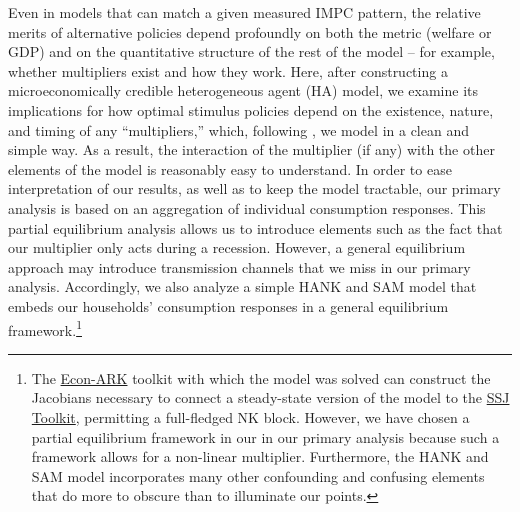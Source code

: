 \documentclass[\econtexRoot/HAFiscal]{subfiles}
\begin{document}
Even in models that can match a given measured IMPC pattern, the relative merits of alternative policies depend profoundly on both the metric (welfare or GDP) and on the quantitative structure of the rest of the model -- for example, whether multipliers exist and how they work. Here, after constructing a microeconomically credible heterogeneous agent (HA) model, we examine its implications for how optimal stimulus policies depend on the existence, nature, and timing of any ``multipliers,'' which, following \cite{kmpHandbook2016}, we model in a clean and simple way.  As a result, the interaction of the multiplier (if any) with the other elements of the model is reasonably easy to understand. In order to ease interpretation of our results, as well as to keep the model tractable, our primary analysis is based on an aggregation of individual consumption responses. This partial equilibrium analysis allows us to introduce elements such as the fact that our multiplier only acts during a recession. However, a general equilibrium approach may introduce transmission channels that we miss in our primary analysis. Accordingly, we also analyze a simple HANK and SAM model that embeds our households' consumption responses in a general equilibrium framework.\footnote{The \href{https://econ-ark.org}{Econ-ARK} toolkit with which the model was solved can construct the Jacobians necessary to connect a steady-state version of the model to the \href{https://github.com/shade-econ/sequence-jacobian}{SSJ Toolkit}, permitting a full-fledged NK block. However, we have chosen a partial equilibrium framework in our in our primary analysis because such a framework allows for a non-linear multiplier. Furthermore, the HANK and SAM model incorporates many other confounding and confusing elements that do more to obscure than to illuminate our points.}
\end{document}
